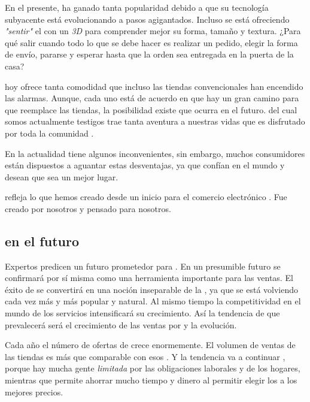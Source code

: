 			En el presente, \ecommerceCOM ha ganado tanta popularidad debido a que su tecnología subyacente está evolucionando a pasos agigantados. Incluso se está ofreciendo \textit{"sentir"} el \itemCOM con un \mousePC \textit{3D} para comprender mejor su forma, tamaño y textura. ¿Para qué salir cuando todo lo que se debe hacer es realizar un pedido, elegir la forma de envío, pararse y esperar hasta que la orden sea entregada en la puerta de la casa?

			\ecommerceCOM hoy ofrece tanta comodidad que incluso las tiendas convencionales han encendido las alarmas. Aunque, cada uno está de acuerdo en que hay un gran camino para que \ecommerceCOM reemplace las tiendas, la posibilidad existe que ocurra en el futuro. \ecommerceCOM del cual somos actualmente testigos trae tanta aventura a nuestras vidas que es disfrutado por toda la comunidad \online.

			En la actualidad \ecommerceCOM tiene algunos inconvenientes, sin embargo, muchos consumidores están dispuestos a aguantar estas desventajas, ya que confían en el mundo \online y desean que sea un mejor lugar.

			\ecommerceCOM refleja lo que hemos creado desde un inicio para el comercio electrónico \online. Fue creado por nosotros y pensado para nosotros.

		\subsection{\ecommerceCOM en el futuro}

			Expertos predicen un futuro prometedor para \ecommerceCOM. En un presumible futuro \ecommerceCOM se confirmará por sí misma como una herramienta importante para las ventas. El éxito de \ecommerceCOM se convertirá en una noción inseparable de la \webINT, ya que \eshopping se está volviendo cada vez más y más popular y natural. Al mismo tiempo la competitividad en el mundo de los servicios \ecommerceCOM intensificará su crecimiento. Así la tendencia de que prevalecerá \ecommerceCOM será el crecimiento de las ventas por \internetINT y la evolución.

			Cada año el número de ofertas de \ecommerceCOM crece enormemente. El volumen de ventas de las tiendas \online  es más que comparable con esos \brickandmortar. Y la tendencia va a continuar \cite{online_growth_ecommerce}, porque hay mucha gente \textit{limitada} por las obligaciones laborales y de los hogares, mientras que \internetINT permite ahorrar mucho tiempo y dinero al permitir  elegir los \itemsCOM a los mejores precios. 

